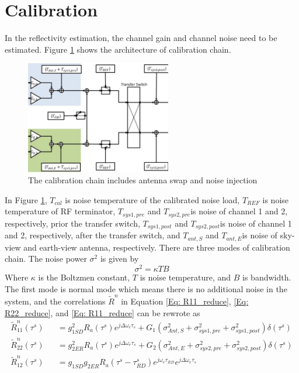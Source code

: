 \documentclass[draftcls,onecolumn]{IEEEtran}  %
\begin{document}
\section{Calibration}
In the reflectivity estimation, the channel gain and channel noise need to be estimated. Figure \ref{fig:Hardware} shows the architecture of calibration chain.
\begin{figure}[t!]
	\centering
	\includegraphics[width=2.5in]{pdf/hardware.pdf}
	\caption{The calibration chain includes antenna swap and noise injection}
	\centering
	\label{fig:Hardware}
\end{figure}
In Figure \ref{fig:Hardware}, $T_{cal}$ is noise temperature of the calibrated noise load, $T_{REF}$ is noise temperature of RF terminator, $T_{sys1,pre}$ and $T_{sys2,pre}$is noise of channel 1 and 2, respectively, prior the transfer switch, $T_{sys1,post}$ and $T_{sys2,post}$is noise of channel 1 and 2, respectively, after the transfer switch, and $T_{ant,S}$ and $T_{ant,E}$is noise of sky-view and earth-view antenna, respectively. There are three modes of calibration chain. The noise power $\sigma^2$ is given by
\begin{equation}
	\sigma^2=\kappa TB
\end{equation}
Where $\kappa$ is the Boltzmen constant, $T$ is noise temperature, and $B$ is bandwidth. The first mode is normal mode which means there is no additional noise in the system, and the correlations $\tilde{R}^n$ in Equation \ref{Eq: R11_reduce}, \ref{Eq: R22_reduce}, and \ref{Eq: R11_reduce} can be rewrote as
\begin{eqnarray}
	\tilde{R}_{11}^n(\tau^s) &&= g^2_{1SD} R_a(\tau^s)e^{j\Delta\omega_e\tau_s}+
G_1(\sigma^2_{Ant,S}+\sigma^2_{sys1,pre} +\sigma^2_{sys1,post}) \delta(\tau^s)                                      
\label{Eq: R11_reduce_norm} \\
	\tilde{R}_{22}^n(\tau^s) &&= g^2_{2ER} R_a(\tau^s)e^{j\Delta\omega_e\tau_s}+
G_2(\sigma^2_{Ant,E}+\sigma^2_{sys2,pre} +\sigma^2_{sys2,post}) \delta(\tau^s)                                       
\label{Eq: R22_reduce_norm} \\
	\tilde{R}_{12}^n(\tau^s) &&= g_{1SD} g_{2ER} R_a(\tau^s-\tau^s_{RD})e^{j\omega_e \tau_{RD}} e^{j\Delta\omega_e\tau_s}  
\label{Eq: R12_reduce_norm}
\end{eqnarray}
\end{document}
